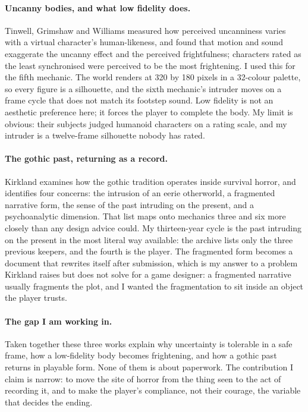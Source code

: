 \documentclass[12pt,a4paper]{article}
\begin{document}
\paragraph{Uncanny bodies, and what low fidelity does.}
Tinwell, Grimshaw and Williams measured how perceived uncanniness varies with a
virtual character's human-likeness, and found that motion and sound exaggerate the
uncanny effect and the perceived frightfulness; characters rated as the least
synchronised were perceived to be the most frightening.\autocite[1]{tinwell2010uncanny}
I used this for the fifth mechanic. The world renders at 320 by 180 pixels in a
32-colour palette, so every figure is a silhouette, and the sixth mechanic's
intruder moves on a frame cycle that does not match its footstep sound. Low
fidelity is not an aesthetic preference here; it forces the player to complete the
body. My limit is obvious: their subjects judged humanoid characters on a rating
scale, and my intruder is a twelve-frame silhouette nobody has rated.

\paragraph{The gothic past, returning as a record.}
Kirkland examines how the gothic tradition operates inside survival horror, and
identifies four concerns: the intrusion of an eerie otherworld, a fragmented
narrative form, the sense of the past intruding on the present, and a
psychoanalytic dimension.\autocite[106]{kirkland2012gothic} That list maps onto
mechanics three and six more closely than any design advice could. My thirteen-year
cycle is the past intruding on the present in the most literal way available: the
archive lists only the three previous keepers, and the fourth is the player. The
fragmented form becomes a document that rewrites itself after submission, which is
my answer to a problem Kirkland raises but does not solve for a game designer: a
fragmented narrative usually fragments the plot, and I wanted the fragmentation to
sit inside an object the player trusts.

\paragraph{The gap I am working in.}
Taken together these three works explain why uncertainty is tolerable in a safe
frame, how a low-fidelity body becomes frightening, and how a gothic past returns
in playable form. None of them is about paperwork. The contribution I claim is
narrow: to move the site of horror from the thing seen to the act of recording
it, and to make the player's compliance, not their courage, the variable that
decides the ending.
\end{document}
